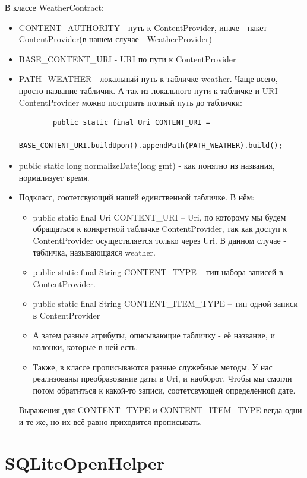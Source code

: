 \documentclass[12 pt]{article}
\begin{document}
	В классе WeatherContract:
	\begin{itemize}
	    \item CONTENT\_AUTHORITY - путь к ContentProvider, иначе - пакет ContentProvider(в нашем случае - WeatherProvider)
	    \item BASE\_CONTENT\_URI - URI по пути к ContentProvider
	    \item PATH\_WEATHER - локальный путь к табличке weather. Чаще всего, просто название табличик. А так из локального пути к табличке и URI ContentProvider можно построить полный путь до таблички: 
	    \begin{lstlisting}
	    public static final Uri CONTENT_URI =
                BASE_CONTENT_URI.buildUpon().appendPath(PATH_WEATHER).build();
        \end{lstlisting}
	    \item public static long normalizeDate(long gmt) - как понятно из названия, нормализует время.
	    \item Подкласс, соотетсвующий нашей единственной табличке.
	    В нём:
	    \begin{itemize}
	        \item public static final Uri CONTENT\_URI -- Uri, по которому мы будем обращаться к конкретной табличке ContentProvider, так как доступ к ContentProvider осуществляется только через Uri. В данном случае - табличка, называющаяся weather.
	        \item public static final String CONTENT\_TYPE -- тип набора записей в ContentProvider.
	        \item public static final String CONTENT\_ITEM\_TYPE -- тип одной записи в ContentProvider
	        \item А затем разные атрибуты, описывающие табличку - её название, и колонки, которые в ней есть.
	        \item Также, в классе прописываются разные служебные методы. У нас реализованы преобразование даты в Uri, и наоборот. Чтобы мы смогли потом обратиться к какой-то записи, соотетсвующей определённой дате.
	    \end{itemize}
	    Выражения для CONTENT\_TYPE и CONTENT\_ITEM\_TYPE вегда одни и те же, но их всё равно приходится прописывать.
	\end{itemize}

\section{SQLiteOpenHelper}	
\end{document}
